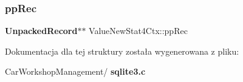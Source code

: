 \mbox{\label{struct_value_new_stat4_ctx_a64e1490828ea95f9edc650a776a121d9}} 
\subsubsection{ppRec}
{\footnotesize\ttfamily \textbf{ Unpacked\+Record}$\ast$$\ast$ Value\+New\+Stat4\+Ctx\+::pp\+Rec}



Dokumentacja dla tej struktury została wygenerowana z pliku\+:\begin{DoxyCompactItemize}
\item 
Car\+Workshop\+Management/\textbf{ sqlite3.\+c}\end{DoxyCompactItemize}
